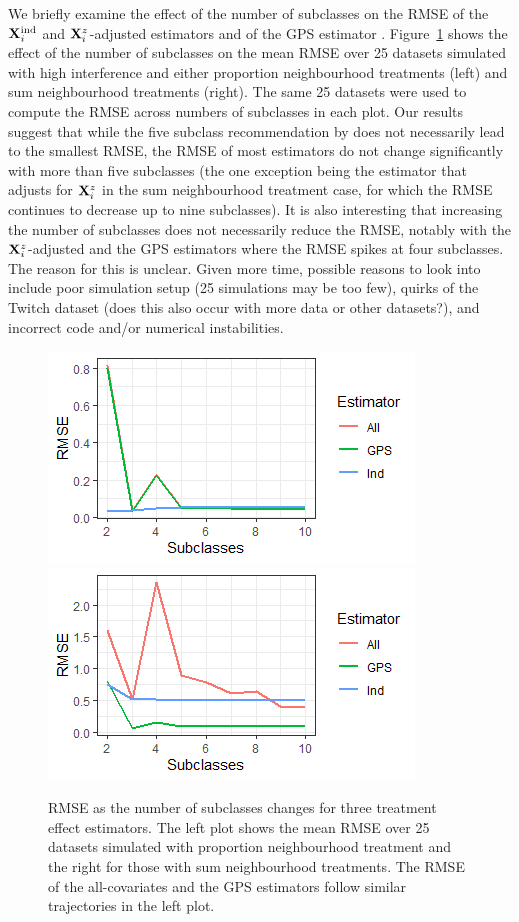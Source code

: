\documentclass[10pt]{article}
\begin{document}
We briefly examine the effect of the number of subclasses on the RMSE of the $\mathbf{X}^{\text{ind}}_i$ and $\mathbf{X}_i^z$-adjusted estimators and of the GPS estimator \parencite{Forastiere:2021}. Figure~\ref{fig:subclass} shows the effect of the number of subclasses on the mean RMSE over 25 datasets simulated with high interference and either proportion neighbourhood treatments (left) and sum neighbourhood treatments (right). The same 25 datasets were used to compute the RMSE across numbers of subclasses in each plot. Our results suggest that while the five subclass recommendation by \textcite{Rosenbaum:1984} does not necessarily lead to the smallest RMSE, the RMSE of most estimators do not change significantly with more than five subclasses (the one exception being the estimator that adjusts for $\mathbf{X}_i^z$ in the sum neighbourhood treatment case, for which the RMSE continues to decrease up to nine subclasses). It is also interesting that increasing the number of subclasses does not necessarily reduce the RMSE, notably with the $\mathbf{X}_i^z$-adjusted and the GPS estimators where the RMSE spikes at four subclasses. The reason for this is unclear. Given more time, possible reasons to look into include poor simulation setup (25 simulations may be too few), quirks of the Twitch dataset (does this also occur with more data or other datasets?), and incorrect code and/or numerical instabilities.

\begin{figure}[ht]
\centering
\includegraphics[trim={0.2cm 0 2.5cm 0},clip]{Images/subclasses_prop.png}
\includegraphics[trim={0.55cm 0 0.2cm 0},clip]{Images/subclasses_sum.png}
\caption{RMSE as the number of subclasses changes for three treatment effect estimators. The left plot shows the mean RMSE over 25 datasets simulated with proportion neighbourhood treatment and the right for those with sum neighbourhood treatments. The RMSE of the all-covariates and the GPS estimators follow similar trajectories in the left plot.}
\label{fig:subclass}
\end{figure}
\end{document}
